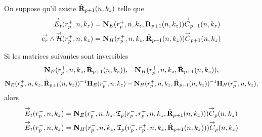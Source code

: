     \begin{prop}%
      \label{prop:cylindre:transfert:reflexion}{}~

      On suppose qu'il existe \(\hat{\mathbf{R}}_{p+1}(n,k_z)\) telle que 
      \begin{align*}
        {\overset{\rightarrow}{E}}_t(r_{p}^+,n,k_z) &= \mathbf{N}_{E}(r_p^+,n,k_z,\hat{\mathbf{R}}_{p+1}(n,k_z)){\overset{\rightarrow}{C}}_{p+1}(n,k_z)
        \\
        {\overset{\rightarrow}{e_r}}\wedge{\overset{\rightarrow}{\mathcal{H}}}(r_{p}^+,n,k_z) &= \mathbf{N}_{H}(r_p^+,n,k_z,\hat{\mathbf{R}}_{p+1}(n,k_z)){\overset{\rightarrow}{C}}_{p+1}(n,k_z)
      \end{align*}

      Si les matrices suivantes sont inversibles
      \begin{align*}
        \mathbf{N}_{E}(r_p^+,n,k_z,\hat{\mathbf{R}}_{p+1}(n,k_z)), && \mathbf{N}_{H}(r_p^+,n,k_z,\hat{\mathbf{R}}_{p+1}(n,k_z)),
      \end{align*}
      \begin{align*}
        \mathbf{N}_{E}(r_p^+,n,k_z,\hat{\mathbf{R}}_{p+1}(n,k_z))^{-1}\mathbf{H}_{E}(r_p^-,n,k_z) - \mathbf{N}_{H}(r_p^+,n,k_z,\hat{\mathbf{R}}_{p+1}(n,k_z))^{-1}\mathbf{H}_{H}(r_p^-,n,k_z),
      \end{align*}
      alors
      \begin{align*}
        {\overset{\rightarrow}{E}}_t(r_{p}^-,n,k_z) &= \mathbf{N}_{E}(r_p^-,n,k_z,\mathfrak{T}_p(r_p^-,r_p^+,n,k_z,\hat{\mathbf{R}}_{p+1}(n,k_z))){\overset{\rightarrow}{C}}_{p}(n,k_z)
        \\
        {\overset{\rightarrow}{E}}_t(r_{p}^-,n,k_z) &= \mathbf{N}_{H}(r_p^-,n,k_z,\mathfrak{T}_p(r_p^-,r_p^+,n,k_z,\hat{\mathbf{R}}_{p+1}(n,k_z))){\overset{\rightarrow}{C}}_{p}(n,k_z)
      \end{align*}
    \end{prop}

